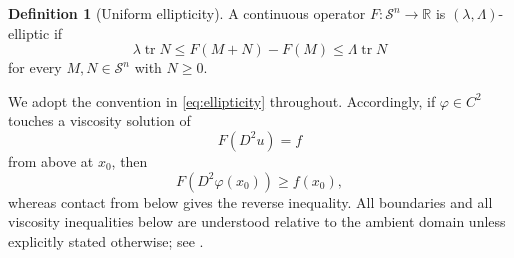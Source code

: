 \documentclass[11pt,letterpaper]{amsart}
\numberwithin{equation}{section}
\DeclareMathOperator{\tr}{tr}
\newcommand{\Sn}{\mathcal S^n}
\newenvironment{leatargetblock}{}{}
\theoremstyle{definition}
\newtheorem{definition}[theorem]{Definition}
\theoremstyle{remark}
\begin{document}
\begin{definition}[Uniform ellipticity]\label{def:ellipticity}
A continuous operator $F:\Sn\to\mathbb R$ is
$(\lambda,\Lambda)$-elliptic if
\begin{equation}\label{eq:ellipticity}
\lambda\tr N
\leq
F(M+N)-F(M)
\leq
\Lambda\tr N
\end{equation}
for every $M,N\in\Sn$ with $N\geq0$.
\end{definition}

\begin{leatargetblock}
We adopt the convention in \eqref{eq:ellipticity} throughout. Accordingly,
if $\varphi\in C^2$ touches a viscosity solution of
$$
F(D^2u)=f
$$
from above at $x_0$, then
$$
F(D^2\varphi(x_0))\geq f(x_0),
$$
whereas contact from below gives the reverse inequality. All boundaries and
all viscosity inequalities below are understood relative to the ambient
domain unless explicitly stated otherwise; see \cite{CrandallIshiiLions}.

\end{leatargetblock}
\end{document}
